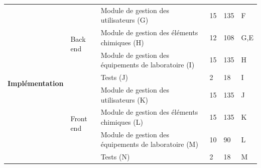 \begin{table}[H]
{\begin{tabular}{|lll|l|ll|}
			\multicolumn{1}{|l|}{\multirow{11}{*}{\textbf{Implémentation}}} & \multicolumn{1}{l|}{\multirow{4}{*}{Back end}}                          & Module de gestion des utilisateurs (G)               & 15                                           & \multicolumn{1}{l|}{135} & F   \\ \cline{3-6}
			\multicolumn{1}{|l|}{}                                          & \multicolumn{1}{l|}{}                                                   & Module de gestion des éléments chimiques (H)         & 12                                           & \multicolumn{1}{l|}{108} & G,E \\ \cline{3-6}
			\multicolumn{1}{|l|}{}                                          & \multicolumn{1}{l|}{}                                                   & Module de gestion des équipements de laboratoire (I) & 15                                           & \multicolumn{1}{l|}{135} & H   \\ \cline{3-6}
			\multicolumn{1}{|l|}{}                                          & \multicolumn{1}{l|}{}                                                   & Tests (J)                                            & 2                                            & \multicolumn{1}{l|}{18}  & I   \\ \cline{2-6}
			\multicolumn{1}{|l|}{}                                          & \multicolumn{1}{l|}{\multirow{4}{*}{Front end}}                         & Module de gestion des utilisateurs (K)               & 15                                           & \multicolumn{1}{l|}{135} & J   \\ \cline{3-6}
			\multicolumn{1}{|l|}{}                                          & \multicolumn{1}{l|}{}                                                   & Module de gestion des éléments chimiques (L)         & 15                                           & \multicolumn{1}{l|}{135} & K   \\ \cline{3-6}
			\multicolumn{1}{|l|}{}                                          & \multicolumn{1}{l|}{}                                                   & Module de gestion des équipements de laboratoire (M) & 10                                           & \multicolumn{1}{l|}{90}  & L   \\ \cline{3-6}
			\multicolumn{1}{|l|}{}                                          & \multicolumn{1}{l|}{}                                                   & Tests (N)                                            & 2                                            & \multicolumn{1}{l|}{18}  & M   \\ \cline{2-6}

\end{tabular}}
\end{table}
